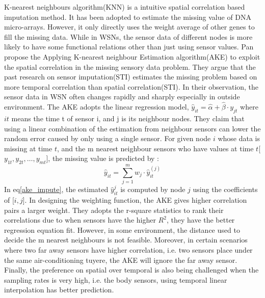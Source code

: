 K-nearest neighbours algorithm(KNN) is a intuitive spatial correlation based imputation method. It has been adopted to estimate the missing value of DNA micro-arrays\cite{Troyanskaya:DNAKNN}. However, it only directly uses the weight average of other genes to fill the missing data. While in WSNs, the sensor data of different nodes is more likely to have some functional relations other than just using sensor values.
Pan\cite{pan2010k} propose the Applying K-nearest neighbour Estimation algorithm(AKE) to exploit the spatial correlation in the missing sensory data problem. They argue that the past research on sensor imputation(STI) estimates the missing problem based on more temporal correlation than spatial correlation(STI). In their observation, the sensor data in WSN often changes rapidly and sharply especially in outside environment. The AKE adopts the linear regression model,
$\hat{y}_{it} =\hat{\alpha} +\hat{\beta}\cdot y_{jt}$
 where $it$ means the time t of sensor i,  and j is its neighbour nodes.  
They claim that using a linear combination of the estimation from neighbour sensors can lower the random error caused by only using a single sensor. 
For given node $i$ whose data is missing at time $t$, and the m nearest neighbour sensors who have values at time $t$[$y_{1t}, y_{2t},\dots, y_{mt}$], the missing value is predicted by :   
 \begin{equation}
 \hat{y}_{it} =\sum_{j=1}^m w_j \cdot \hat{y}_{it}^{(j)}
 \label{ake_impute}
 \end{equation}
%
In eq\ref{ake_impute}, the estimated $\hat{y}_{it}^{j}$ is computed by node $j$ using the coefficients of [$i,j$]. In designing the weighting function, the AKE gives higher correlation pairs a larger weight. They adopts the r-square statistics to rank their correlations due to when sensors have the higher $R^2$, they have the better regression equation fit. 
However, in some environment, the distance used to decide the m nearest neighbours is not feasible. 
Moreover, in certain scenarios where two far away sensors have higher correlation, i.e. two sensors place under the same air-conditioning tuyere, the AKE will ignore the far away sensor.
Finally, the preference on spatial over temporal is also being challenged when the sampling rates is very high, i.e. the body sensors, using temporal linear interpolation has better prediction.   

